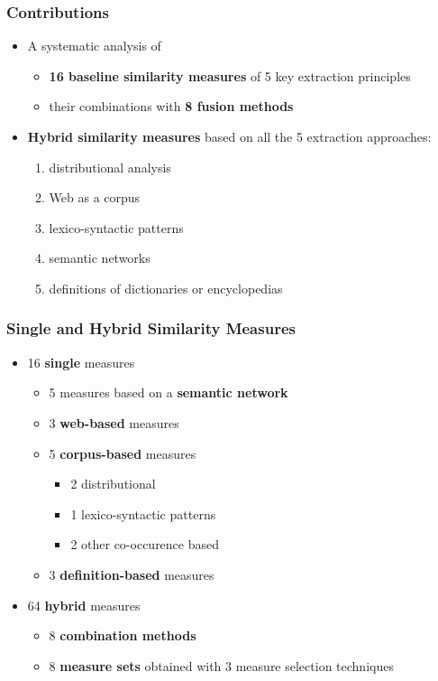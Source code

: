 \documentclass{beamer}
\begin{document}
\begin{frame}
\frametitle{Contributions}
\begin{itemize}
\item A systematic analysis of 
\begin{itemize}
  \item \textbf{16 baseline similarity measures} of 5 key extraction principles
  \item their combinations with \textbf{8 fusion methods} 
\end{itemize}

\item \textbf{Hybrid similarity measures} based on all the 5 extraction approaches:
\begin{enumerate}
  \item distributional analysis
  \item Web as a corpus 
  \item	lexico-syntactic patterns
  \item	semantic networks 
  \item definitions of dictionaries or encyclopedias 
\end{enumerate}

 

\end{itemize}

\end{frame}


\begin{frame}
\frametitle{Single and Hybrid Similarity Measures}
\begin{itemize}
\item 16 \textbf{single} measures
	\begin{itemize}
	\item 5 measures based on a \textbf{semantic network} 
	\item 3 \textbf{web-based} measures
	\item 5 \textbf{corpus-based} measures 
	\begin{itemize}
	  \item 2 distributional
	  \item 1 lexico-syntactic patterns
	  \item 2 other co-occurence based
	\end{itemize}
	\item 3 \textbf{definition-based} measures 
\end{itemize}
\item 64 \textbf{hybrid} measures
	\begin{itemize}
	\item 8 \textbf{combination methods}
	\item 8 \textbf{measure sets} obtained with 3 measure selection techniques
	\end{itemize}
\end{itemize}

\end{frame}
\end{document}
